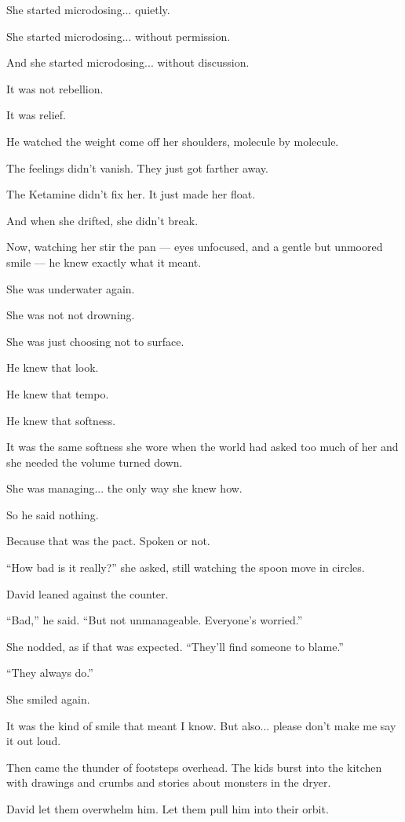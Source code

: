 She started microdosing... quietly. 

She started microdosing... without permission.

And she started microdosing... without discussion. 

It was not rebellion.

It was relief.

He watched the weight come off her shoulders, molecule by molecule.

The feelings didn’t vanish. 
They just got farther away.

The Ketamine didn’t fix her. 
It just made her float.

And when she drifted, she didn’t break.

Now, watching her stir the pan --- eyes unfocused, and a gentle but unmoored smile --- 
he knew exactly what it meant.

She was underwater again.

She was not not drowning.

She was just choosing not to surface.

He knew that look. 

He knew that tempo. 

He knew that softness.

It was the same softness she wore when the world had asked too much of her and she 
needed the volume turned down.

She was managing... the only way she knew how.

So he said nothing.

Because that was the pact.
Spoken or not.

``How bad is it really?'' she asked, still watching the spoon move in circles.

David leaned against the counter.

``Bad,'' he said. ``But not unmanageable. Everyone’s worried.''

She nodded, as if that was expected. ``They’ll find someone to blame.''

``They always do.''

She smiled again.

It was the kind of smile that meant I know.
But also... please don’t make me say it out loud.

Then came the thunder of footsteps overhead. The kids burst into the kitchen with drawings and crumbs 
and stories about monsters in the dryer.

David let them overwhelm him. Let them pull him into their orbit.

